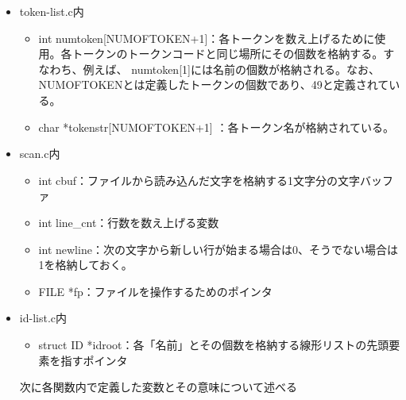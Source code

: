 \documentclass{jarticle}
\begin{document}
\begin{itemize}
  \item token-list.c内
  \begin{itemize}
    \item int
    numtoken[NUMOFTOKEN+1]：各トークンを数え上げるために使用。各トークンのトークンコードと同じ場所にその個数を格納する。すなわち、例えば、
    numtoken[1]には名前の個数が格納される。なお、NUMOFTOKENとは定義したトークンの個数であり、49と定義されている。
    \item char *tokenstr[NUMOFTOKEN+1] ：各トークン名が格納されている。
  \end{itemize}
  \item scan.c内
  \begin{itemize}
    \item int cbuf：ファイルから読み込んだ文字を格納する1文字分の文字バッファ
    \item int line\_cnt：行数を数え上げる変数
    \item int newline：次の文字から新しい行が始まる場合は0、そうでない場合は1を格納しておく。
    \item FILE *fp：ファイルを操作するためのポインタ
  \end{itemize}
  \item id-list.c内
  \begin{itemize}
    \item struct ID *idroot：各「名前」とその個数を格納する線形リストの先頭要素を指すポインタ
  \end{itemize}

  次に各関数内で定義した変数とその意味について述べる


\end{itemize}
\end{document}
